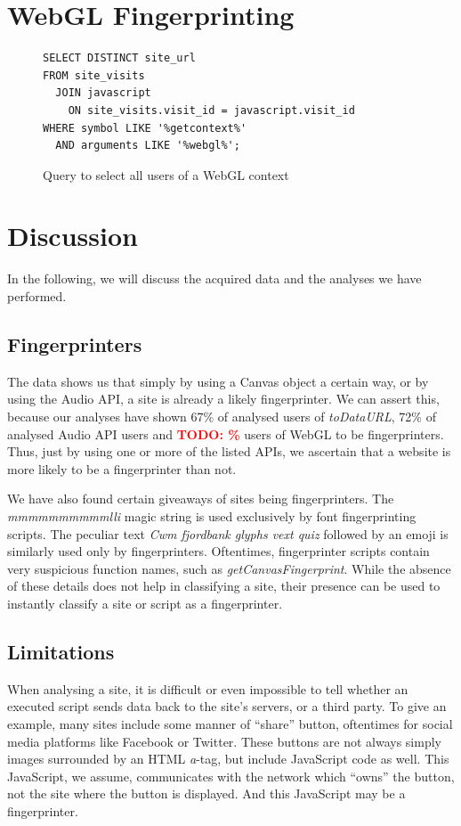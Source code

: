 \documentclass[
    fontsize=12pt,
    headings=small,
    parskip=half,
    bibliography=totoc,
    numbers=noenddot,
    open=any
    ]{scrreprt}
\newcommand{\todo}[1]{\textcolor{red}{\textbf{TODO: #1}}}
\begin{document}
\section{WebGL Fingerprinting}

\begin{figure}
\begin{verbatim}
SELECT DISTINCT site_url
FROM site_visits
  JOIN javascript
    ON site_visits.visit_id = javascript.visit_id
WHERE symbol LIKE '%getcontext%'
  AND arguments LIKE '%webgl%';
\end{verbatim}
\caption{Query to select all users of a WebGL context}
\label{code:webgl_query}
\end{figure}


\section{Discussion}
In the following, we will discuss the acquired data and the analyses we have performed.

\subsection{Fingerprinters}
The data shows us that simply by using a Canvas object a certain way, or by using the Audio API,
a site is already a likely fingerprinter. We can assert this, because our analyses have shown
67\% of analysed users of \textit{toDataURL}, 72\% of analysed Audio API users and \todo{\%}
users of WebGL to be fingerprinters.
Thus, just by using one or more of the listed APIs, we ascertain that a website is more likely
to be a fingerprinter than not.

We have also found certain giveaways of sites being fingerprinters.
The \textit{mmmmmmmmmmlli} magic string is used exclusively by font fingerprinting scripts.
The peculiar text \textit{Cwm fjordbank glyphs vext quiz} followed by an emoji is similarly used only
by fingerprinters.
Oftentimes, fingerprinter scripts contain very suspicious function names, such as \textit{getCanvasFingerprint}.
While the absence of these details does not help in classifying a site,
their presence can be used to instantly classify a site or script as a fingerprinter.



\subsection{Limitations}
When analysing a site, it is difficult or even impossible to tell whether an executed
script sends data back to the site's servers, or a third party.
To give an example, many sites include some manner of ``share'' button,
oftentimes for social media platforms like Facebook or Twitter.
These buttons are not always simply images surrounded by an HTML \textit{a}-tag,
but include JavaScript code as well.
This JavaScript, we assume, communicates with the network which ``owns''
the button, not the site where the button is displayed.
And this JavaScript may be a fingerprinter.
\end{document}
